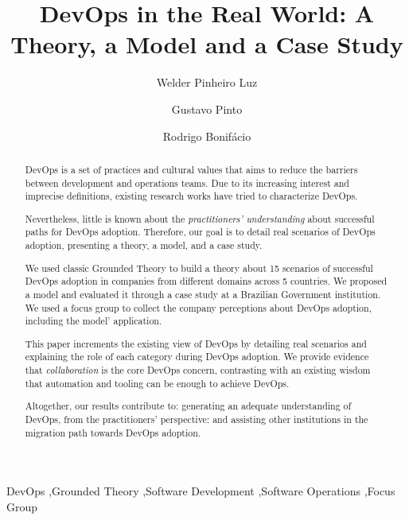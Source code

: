 \documentclass[preprint,12pt,3p]{elsarticle}
\begin{document}
\begin{frontmatter}

\title{DevOps in the Real World: A Theory, a Model and a Case Study}

\author[label1]{Welder Pinheiro Luz}
\address[label1]{Brazilian Federal Court of Accounts}

\author[label2]{Gustavo Pinto}
\address[label2]{Federal University of Par\'a}

\author[label3]{Rodrigo Bonif\'acio}
\address[label3]{University of Bras\'{i}lia}

\begin{abstract}

DevOps is a set of practices and cultural values
that aims to reduce the
barriers between development and operations
teams. Due to its increasing interest and imprecise
definitions, existing research works have tried to
characterize DevOps.

Nevertheless, little is
known about the \emph{practitioners' understanding}
about successful paths for DevOps adoption. Therefore, our goal is to detail
real scenarios of DevOps adoption, presenting a theory, a model, and a case study.

We used classic Grounded Theory to build a theory about 15
scenarios of successful DevOps adoption in companies from different
domains across 5 countries. We proposed a model and evaluated it through
a case study at a Brazilian Government institution. We used a focus group to
collect the company perceptions about DevOps adoption, including the model'
application.

This paper increments the existing view of
DevOps by detailing real scenarios and explaining the role of each
category during DevOps adoption.
We provide evidence that \emph{collaboration} is the core DevOps concern,
contrasting with an existing wisdom that automation and tooling can be enough
to achieve DevOps.

Altogether, our results contribute to: generating
an adequate understanding of DevOps, from the practitioners' perspective; and
assisting other institutions in the migration path towards DevOps adoption.

\end{abstract}

\begin{keyword}
DevOps \sep Grounded Theory \sep Software Development \sep Software Operations \sep Focus Group
\end{keyword}

\end{frontmatter}






















\end{document}
